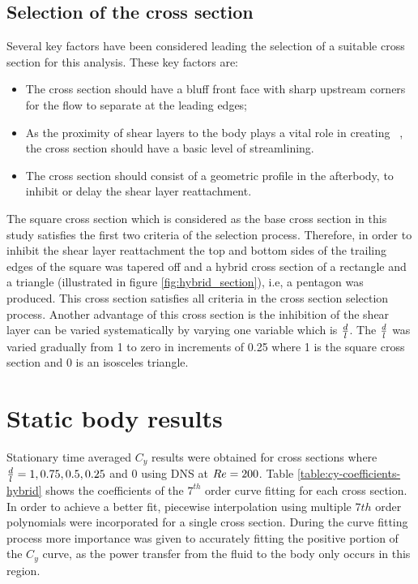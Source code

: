 \subsection*{Selection of the cross section}



Several key factors have been considered leading the selection of a suitable cross section for this analysis. These key factors are:

\begin{itemize}
\item The cross section should have a bluff front face with sharp upstream corners for the flow to separate at the leading edges;

\item As the proximity of shear layers to the body plays a vital role in creating \cy\ \citep{Parkinson1989}, the cross section should have a basic level of streamlining.

\item The cross section should consist of a geometric profile in the afterbody, to inhibit or delay the shear layer reattachment.   
\end{itemize}

The square cross section which is considered as the base cross section in this study satisfies the first two criteria of the selection process. Therefore, in order to inhibit the shear layer reattachment the top and bottom sides of the trailing edges of the square was tapered off and a hybrid cross section of a rectangle and a triangle (illustrated in figure \ref{fig:hybrid_section}), i.e, a pentagon was produced. This cross section satisfies all criteria in the cross section selection process. Another advantage of this cross section is the inhibition of the shear layer can be varied systematically by varying one variable which is $\frac{d}{l}$. The $\frac{d}{l}$ was varied gradually from 1 to zero in increments of 0.25 where 1 is the square cross section and 0 is an isosceles triangle. 


\section{Static body results}
\label{sec:cross-sec-Static body results}



Stationary time averaged $C_y$ results were obtained for cross sections where $\frac{d}{l}=1,0.75,0.5,0.25$ and $0$ using DNS at $Re=200$. Table \ref{table:cy-coefficients-hybrid} shows the coefficients of the $7^{th}$ order curve fitting for each cross section. In order to achieve a better fit, piecewise interpolation using multiple $7th$ order polynomials were incorporated for a single cross section. During the curve fitting process more importance was given to accurately fitting the positive portion of the $C_{y}$ curve, as the power transfer from the fluid to the body only occurs in this region. 

